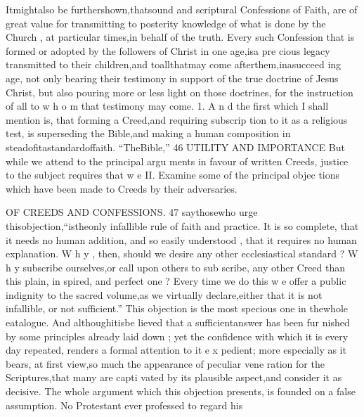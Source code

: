 \documentclass[
]{book}
\begin{document}
Itmightalso be furthershown,thatsound and scriptural Confessions of Faith, are of great value for transmitting to posterity knowledge of what is done by the Church , at particular times,in behalf of the truth. Every such Confession that is formed or adopted by the followers of Christ in one age,isa pre
cious legacy transmitted to their children,and toallthatmay come afterthem,inasucceed ing age, not only bearing their testimony in support of the true doctrine of Jesus Christ,
but also pouring more or less light on those doctrines, for the instruction of all to w h o m that testimony may come.
1. A n d the first which I shall mention is, that forming a Creed,and requiring subscrip tion to it as a religious test, is superseding the
Bible,and making a human composition in steadofitastandardoffaith. ``TheBible,''
46 UTILITY AND IMPORTANCE
But while we attend to the principal argu ments in favour of written Creeds, justice to
the subject requires that w e
II. Examine some of the principal objec
tions which have been made to Creeds by their adversaries.

OF CREEDS AND CONFESSIONS. 47
saythosewho urge thisobjection,``istheonly infallible rule of faith and practice. It is so
complete, that it needs no human addition, and so easily understood , that it requires no
human explanation. W h y , then, should we desire any other ecclesiastical standard ? W h y subscribe ourselves,or call upon others to sub scribe, any other Creed than this plain, in spired, and perfect one ? Every time we do this w e offer a public indignity to the sacred volume,as we virtually declare,either that it is not infallible, or not sufficient.''
This objection is the most specious one in thewhole eatalogue. And althoughitisbe lieved that a sufficientanswer has been fur nished by some principles already laid down ; yet the confidence with which it is every day repeated, renders a formal attention to it e x pedient; more especially as it bears, at first view,so much the appearance of peculiar vene ration for the Scriptures,that many are capti
vated by its plausible aspect,and consider it as decisive.
The whole argument which this objection presents, is founded on a false assumption.
No Protestant ever professed to regard his
\end{document}
